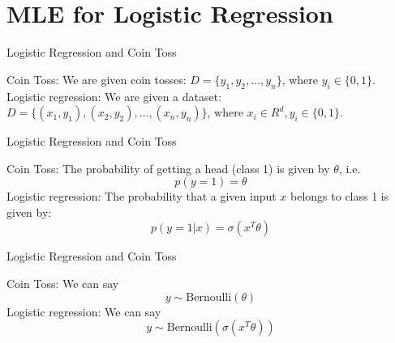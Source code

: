 \documentclass{beamer}
\begin{document}
\section{MLE for Logistic Regression}


\begin{frame}{Logistic Regression and Coin Toss}

    Coin Toss: We are given coin tosses: $D = \{y_1, y_2, \ldots, y_n\}$, where $y_i\in \{0,1\}$. \\
    \vspace{10pt}
    \pause  Logistic regression: We are given a dataset: $D = \{(x_1, y_1), (x_2,y_2), \ldots, (x_n, y_n)\}$, where $x_i\in R^d, y_i\in \{0,1\}$. \\

    

    

    
\end{frame}

\begin{frame}{Logistic Regression and Coin Toss}

    Coin Toss: The probability of getting a head (class 1) is given by $\theta$, i.e.
    $$p(y=1) = \theta$$
    \vspace{10pt}
    \pause 
    Logistic regression: The probability that a given input $x$ belongs to class 1 is given by:
    $$p(y=1|x) = \sigma(x^T\theta)$$
\end{frame}

\begin{frame}{Logistic Regression and Coin Toss}

    Coin Toss: We can say 
    $$y \sim \text{Bernoulli}(\theta)$$
    \vspace{10pt}
    \pause 
    Logistic regression: We can say
    $$y \sim \text{Bernoulli}(\sigma(x^T\theta))$$
\end{frame}\
\end{document}
